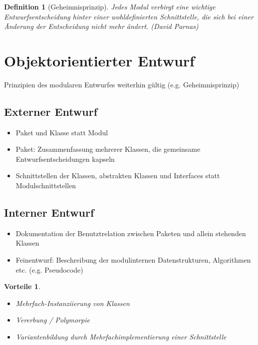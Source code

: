 \documentclass[a4paper]{article}
\theoremstyle{break}
\newtheorem{defi}{Definition}[section]
\newtheorem{why}{Vorteile}[section]
\begin{document}
\begin{defi}[Geheimnisprinzip]
	Jedes Modul verbirgt eine wichtige Entwurfsentscheidung hinter einer wohldefinierten Schnittstelle, die sich bei einer Änderung der Entscheidung nicht mehr ändert. (David Parnas)
\end{defi}

\section{Objektorientierter Entwurf}
	Prinzipien des modularen Entwurfes weiterhin gültig (e.g. Geheimnisprinzip)
\subsection{Externer Entwurf}
\begin{itemize}
	\item Paket und Klasse statt Modul
	\item Paket: Zusammenfassung mehrerer Klassen, die gemeinsame Entwurfsentscheidungen kapseln
	\item Schnittstellen der Klassen, abstrakten Klassen und Interfaces statt Modulschnittstellen
\end{itemize}
\subsection{Interner Entwurf}
\begin{itemize}
	\item Dokumentation der Benutztrelation zwischen Paketen und allein stehenden Klassen
	\item Feinentwurf: Beschreibung der modulinternen Datenstrukturen, Algorithmen etc. (e.g. Pseudocode) 
\end{itemize}	
\begin{why}
	\begin{itemize}
		\item Mehrfach-Instanziierung von Klassen
		\item Vererbung / Polymorpie
		\item Variantenbildung durch Mehrfachimplementierung einer Schnittstelle
	\end{itemize}
\end{why}	
\end{document}
